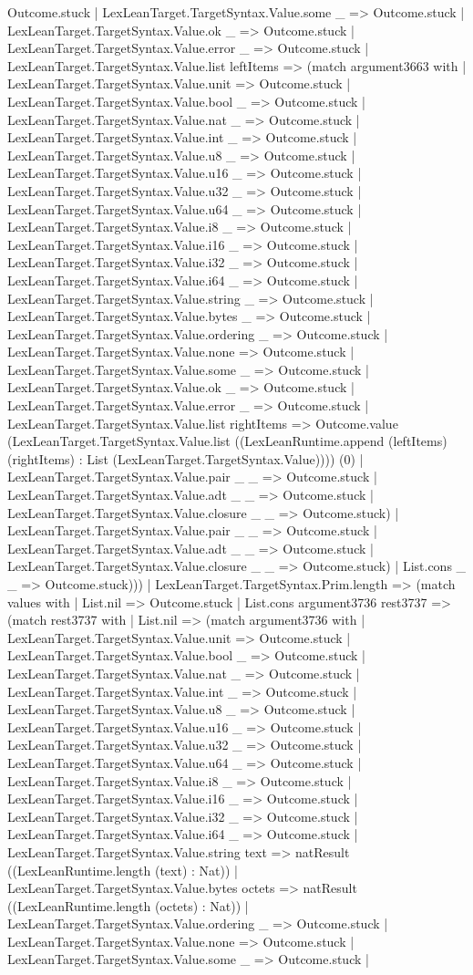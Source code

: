 \documentclass[11pt]{article}
\begin{document}
Outcome.stuck | LexLeanTarget.TargetSyntax.Value.some \_ => Outcome.stuck | LexLeanTarget.TargetSyntax.Value.ok \_ => Outcome.stuck | LexLeanTarget.TargetSyntax.Value.error \_ => Outcome.stuck | LexLeanTarget.TargetSyntax.Value.list leftItems => (match argument3663 with | LexLeanTarget.TargetSyntax.Value.unit => Outcome.stuck | LexLeanTarget.TargetSyntax.Value.bool \_ => Outcome.stuck | LexLeanTarget.TargetSyntax.Value.nat \_ => Outcome.stuck | LexLeanTarget.TargetSyntax.Value.int \_ => Outcome.stuck | LexLeanTarget.TargetSyntax.Value.u8 \_ => Outcome.stuck | LexLeanTarget.TargetSyntax.Value.u16 \_ => Outcome.stuck | LexLeanTarget.TargetSyntax.Value.u32 \_ => Outcome.stuck | LexLeanTarget.TargetSyntax.Value.u64 \_ => Outcome.stuck | LexLeanTarget.TargetSyntax.Value.i8 \_ => Outcome.stuck | LexLeanTarget.TargetSyntax.Value.i16 \_ => Outcome.stuck | LexLeanTarget.TargetSyntax.Value.i32 \_ => Outcome.stuck | LexLeanTarget.TargetSyntax.Value.i64 \_ => Outcome.stuck | LexLeanTarget.TargetSyntax.Value.string \_ => Outcome.stuck | LexLeanTarget.TargetSyntax.Value.bytes \_ => Outcome.stuck | LexLeanTarget.TargetSyntax.Value.ordering \_ => Outcome.stuck | LexLeanTarget.TargetSyntax.Value.none => Outcome.stuck | LexLeanTarget.TargetSyntax.Value.some \_ => Outcome.stuck | LexLeanTarget.TargetSyntax.Value.ok \_ => Outcome.stuck | LexLeanTarget.TargetSyntax.Value.error \_ => Outcome.stuck | LexLeanTarget.TargetSyntax.Value.list rightItems => Outcome.value (LexLeanTarget.TargetSyntax.Value.list ((LexLeanRuntime.append (leftItems) (rightItems) : List (LexLeanTarget.TargetSyntax.Value)))) (0) | LexLeanTarget.TargetSyntax.Value.pair \_ \_ => Outcome.stuck | LexLeanTarget.TargetSyntax.Value.adt \_ \_ => Outcome.stuck | LexLeanTarget.TargetSyntax.Value.closure \_ \_ => Outcome.stuck) | LexLeanTarget.TargetSyntax.Value.pair \_ \_ => Outcome.stuck | LexLeanTarget.TargetSyntax.Value.adt \_ \_ => Outcome.stuck | LexLeanTarget.TargetSyntax.Value.closure \_ \_ => Outcome.stuck) | List.cons \_ \_ => Outcome.stuck))) | LexLeanTarget.TargetSyntax.Prim.length => (match values with | List.nil => Outcome.stuck | List.cons argument3736 rest3737 => (match rest3737 with | List.nil => (match argument3736 with | LexLeanTarget.TargetSyntax.Value.unit => Outcome.stuck | LexLeanTarget.TargetSyntax.Value.bool \_ => Outcome.stuck | LexLeanTarget.TargetSyntax.Value.nat \_ => Outcome.stuck | LexLeanTarget.TargetSyntax.Value.int \_ => Outcome.stuck | LexLeanTarget.TargetSyntax.Value.u8 \_ => Outcome.stuck | LexLeanTarget.TargetSyntax.Value.u16 \_ => Outcome.stuck | LexLeanTarget.TargetSyntax.Value.u32 \_ => Outcome.stuck | LexLeanTarget.TargetSyntax.Value.u64 \_ => Outcome.stuck | LexLeanTarget.TargetSyntax.Value.i8 \_ => Outcome.stuck | LexLeanTarget.TargetSyntax.Value.i16 \_ => Outcome.stuck | LexLeanTarget.TargetSyntax.Value.i32 \_ => Outcome.stuck | LexLeanTarget.TargetSyntax.Value.i64 \_ => Outcome.stuck | LexLeanTarget.TargetSyntax.Value.string text => natResult ((LexLeanRuntime.length (text) : Nat)) | LexLeanTarget.TargetSyntax.Value.bytes octets => natResult ((LexLeanRuntime.length (octets) : Nat)) | LexLeanTarget.TargetSyntax.Value.ordering \_ => Outcome.stuck | LexLeanTarget.TargetSyntax.Value.none => Outcome.stuck | LexLeanTarget.TargetSyntax.Value.some \_ => Outcome.stuck | 
\end{document}
